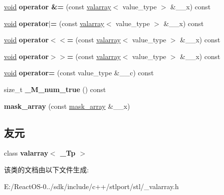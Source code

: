 \begin{DoxyCompactItemize}
\hyperlink{interfacevoid}{void} {\bfseries operator \&=} (const \hyperlink{classvalarray}{valarray}$<$ value\+\_\+type $>$ \&\+\_\+\+\_\+x) const
\item 
\mbox{\label{classmask__array_abc8548b531d18f946751d720d578a4b3}} 
\hyperlink{interfacevoid}{void} {\bfseries operator$\vert$=} (const \hyperlink{classvalarray}{valarray}$<$ value\+\_\+type $>$ \&\+\_\+\+\_\+x) const
\item 
\mbox{\label{classmask__array_ada322ed84bfa560b0d54e82b04522e80}} 
\hyperlink{interfacevoid}{void} {\bfseries operator$<$$<$=} (const \hyperlink{classvalarray}{valarray}$<$ value\+\_\+type $>$ \&\+\_\+\+\_\+x) const
\item 
\mbox{\label{classmask__array_a806c14b4634321b419c5cc1bb0172d1c}} 
\hyperlink{interfacevoid}{void} {\bfseries operator$>$$>$=} (const \hyperlink{classvalarray}{valarray}$<$ value\+\_\+type $>$ \&\+\_\+\+\_\+x) const
\item 
\mbox{\label{classmask__array_acc7618ee68573544081ae54962ae4dd3}} 
\hyperlink{interfacevoid}{void} {\bfseries operator=} (const value\+\_\+type \&\+\_\+\+\_\+c) const
\item 
\mbox{\label{classmask__array_aff7c18615494c796413b856e6e051ed9}} 
size\+\_\+t {\bfseries \+\_\+\+M\+\_\+num\+\_\+true} () const
\item 
\mbox{\label{classmask__array_abad5acc64d40b664e290b66458d2cc4c}} 
{\bfseries mask\+\_\+array} (const \hyperlink{classmask__array}{mask\+\_\+array} \&\+\_\+\+\_\+x)
\end{DoxyCompactItemize}
\subsection*{友元}
\begin{DoxyCompactItemize}
\item 
\mbox{\label{classmask__array_a0d82c6ffc3aec42e2ffa8d69cd3f0945}} 
class {\bfseries valarray$<$ \+\_\+\+Tp $>$}
\end{DoxyCompactItemize}


该类的文档由以下文件生成\+:\begin{DoxyCompactItemize}
\item 
E\+:/\+React\+O\+S-\/0../sdk/include/c++/stlport/stl/\+\_\+valarray.\+h\end{DoxyCompactItemize}

